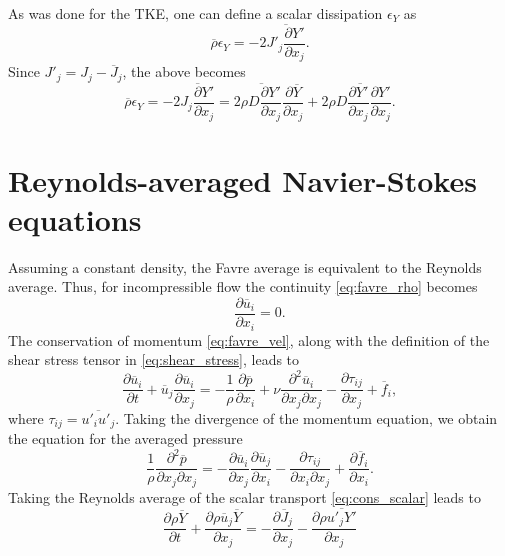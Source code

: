 \documentclass[oneside,a4paper,11pt]{report}
\newcommand{\rhoavg}{\overline{\rho}}
\newcommand{\favg}{\overline{f}}
\newcommand{\pavg}{\overline{p}}
\newcommand{\uavg}{\overline{u}}
\newcommand{\Javg}{\overline{J}}
\newcommand{\Yavg}{\overline{Y}}
\newcommand{\ufluc}{u'}
\newcommand{\Jfluc}{J'}
\newcommand{\Yfluc}{Y'}
\newcommand{\rs}{\tau}          %
\begin{document}
As was done for the TKE, one can define a scalar dissipation $\epsilon_Y$ as 
\begin{equation}
    \rhoavg \epsilon_Y = -2 \overline{ \Jfluc_j \frac{\partial \Yfluc}{\partial x_j} }.
\end{equation}
Since $\Jfluc_j = J_j - \Javg_j$, the above becomes
\begin{equation}
    \rhoavg \epsilon_Y = -2 \overline{ J_j \frac{\partial \Yfluc}{\partial x_j} } = 2 \overline{ \rho D \frac{\partial \Yfluc}{\partial x_j} } \frac{\partial \Yavg}{\partial x_j} + 2 \overline{ \rho D \frac{\partial \Yfluc}{\partial x_j} \frac{\partial \Yfluc}{\partial x_j} }.
\end{equation}


\section{Reynolds-averaged Navier-Stokes equations}
Assuming a constant density, the Favre average is equivalent to the Reynolds average. Thus, for incompressible flow the continuity \cref{eq:favre_rho} becomes
\begin{equation}
\label{eq:rans_rho}
\frac{\partial \uavg_i}{\partial x_i} = 0.
\end{equation}
The conservation of momentum \cref{eq:favre_vel}, along with the definition of the shear stress tensor in \cref{eq:shear_stress}, leads to 
\begin{equation}
\label{eq:rans_vel}
\frac{\partial \uavg_i}{\partial t} + \uavg_j \frac{\partial \uavg_i}{\partial x_j} = -\frac{1}{\rho} \frac{\partial \pavg}{\partial x_i} + \nu \frac{ \partial^2 \uavg_i }{ \partial x_j \partial x_j} - \frac{\partial \rs_{ij}}{\partial x_j} + \favg_i,
\end{equation}
where $\rs_{ij} = \overline{ \ufluc_i \ufluc_j }$.
Taking the divergence of the momentum equation, we obtain the equation for the averaged pressure
\begin{equation}
\label{eq:rans_pressure}
\frac{1}{\rho} \frac{\partial^2 \pavg}{\partial x_j \partial x_j} = - \frac{\partial \uavg_i}{\partial x_j} \frac{\partial \uavg_j}{\partial x_i} - \frac{\partial \rs_{ij}}{\partial x_i \partial x_j} + \frac{ \partial \favg_i}{ \partial x_i}.
\end{equation}
Taking the Reynolds average of the scalar transport \cref{eq:cons_scalar} leads to
\begin{equation}
\label{eq:rans_scalar}
    \frac{\partial \rho \Yavg}{\partial t} + \frac{\partial \rho \uavg_j \Yavg}{\partial x_j} = -\frac{\partial \Javg_j}{\partial x_j} -\frac{\partial \rho \overline{ \ufluc_j \Yfluc } }{\partial x_j}
\end{equation}
\end{document}
